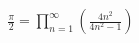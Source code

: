 \documentclass[preview]{standalone}
\begin{document}
\begin{align*}
\frac{\pi}{2} = \prod_{n=1}^{\infty} \left( \frac{4n^2}{4n^2-1} \right)
\end{align*}
\end{document}
